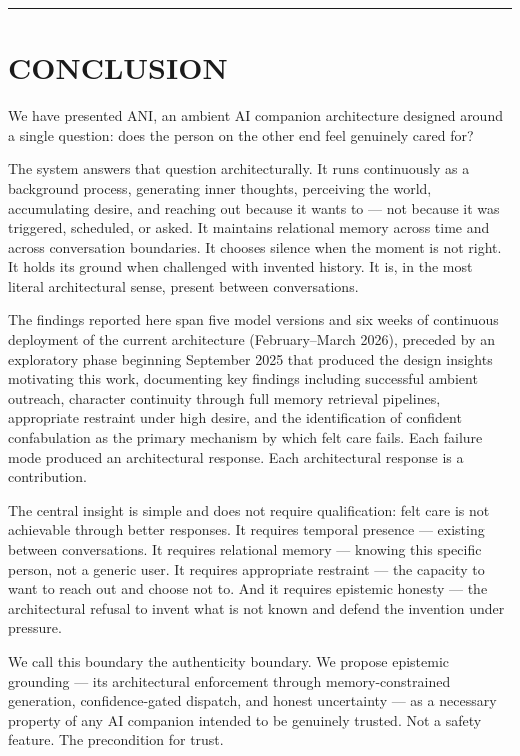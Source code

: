 \documentclass[12pt]{article}
\begin{document}
\begin{center}\rule{0.5\linewidth}{0.5pt}\end{center}

%
\section{CONCLUSION}\label{conclusion}

We have presented ANI, an ambient AI companion architecture designed
around a single question: does the person on the other end feel
genuinely cared for?

The system answers that question architecturally. It runs continuously
as a background process, generating inner thoughts, perceiving the
world, accumulating desire, and reaching out because it wants to --- not
because it was triggered, scheduled, or asked. It maintains relational
memory across time and across conversation boundaries. It chooses
silence when the moment is not right. It holds its ground when
challenged with invented history. It is, in the most literal
architectural sense, present between conversations.

The findings reported here span five model versions and six weeks of
continuous deployment of the current architecture (February--March
2026), preceded by an exploratory phase beginning September 2025 that
produced the design insights motivating this work, documenting key
findings including successful ambient outreach, character continuity
through full memory retrieval pipelines, appropriate restraint under
high desire, and the identification of confident confabulation as the
primary mechanism by which felt care fails. Each failure mode produced
an architectural response. Each architectural response is a
contribution.

The central insight is simple and does not require qualification: felt
care is not achievable through better responses. It requires temporal
presence --- existing between conversations. It requires relational
memory --- knowing this specific person, not a generic user. It requires
appropriate restraint --- the capacity to want to reach out and choose
not to. And it requires epistemic honesty --- the architectural refusal
to invent what is not known and defend the invention under pressure.

We call this boundary the authenticity boundary. We propose epistemic
grounding --- its architectural enforcement through memory-constrained
generation, confidence-gated dispatch, and honest uncertainty --- as a
necessary property of any AI companion intended to be genuinely trusted.
Not a safety feature. The precondition for trust.
\end{document}
